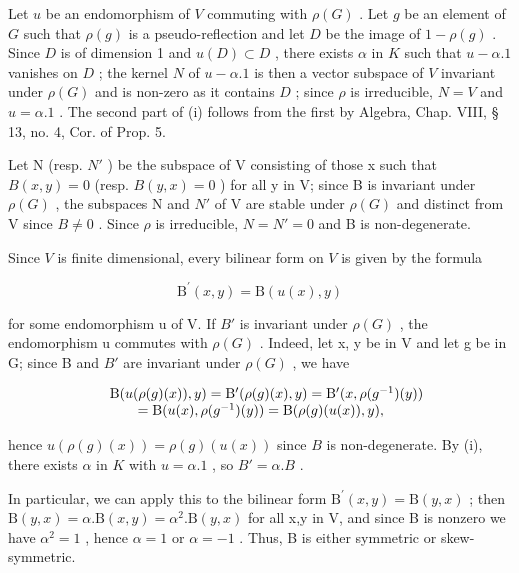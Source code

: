Let \(u\) be an endomorphism of \(V\) commuting with \(\rho(G)\) . Let \(g\) be an element of \(G\) such that \(\rho(g)\) is a pseudo-reflection and let \(D\) be the image of \(1 - \rho(g)\) . Since \(D\) is of dimension 1 and \(u(D) \subset D\) , there exists \(\alpha\) in \(K\) such that \(u - \alpha.1\) vanishes on \(D\) ; the kernel \(N\) of \(u - \alpha.1\) is then a vector subspace of \(V\) invariant under \(\rho(G)\) and is non-zero as it contains \(D\) ; since \(\rho\) is irreducible, \(N = V\) and \(u = \alpha.1\) . The second part of (i) follows from the first by Algebra, Chap. VIII, § 13, no. 4, Cor. of Prop. 5.

Let N (resp. \(N'\) ) be the subspace of V consisting of those x such that \(B(x,y)=0\) (resp. \(B(y,x)=0\) ) for all y in V; since B is invariant under \(\rho(G)\) , the subspaces N and \(N'\) of V are stable under \(\rho(G)\) and distinct from V since \(B\neq0\) . Since \(\rho\) is irreducible, \(N=N'=0\) and B is non-degenerate.

Since \(V\) is finite dimensional, every bilinear form on \(V\) is given by the formula

\[
\mathrm{B} ^ {\prime} (x, y) = \mathrm{B} (u (x), y)\tag{3}
\]

for some endomorphism u of V. If \(B'\) is invariant under \(\rho(G)\) , the endomorphism u commutes with \(\rho(G)\) . Indeed, let x, y be in V and let g be in G; since B and \(B'\) are invariant under \(\rho(G)\) , we have

\[
\begin{array}{r l} & {\mathrm{B} (u (\rho (g) (x)), y) = \mathrm{B} ^ {\prime} (\rho (g) (x), y) = \mathrm{B} ^ {\prime} (x, \rho (g ^ {- 1}) (y))} \\ & {\qquad = \mathrm{B} (u (x), \rho (g ^ {- 1}) (y)) = \mathrm{B} (\rho (g) (u (x)), y),} \end{array}
\]

hence \(u(\rho(g)(x)) = \rho(g)(u(x))\) since \(B\) is non-degenerate. By (i), there exists \(\alpha\) in \(K\) with \(u = \alpha.1\) , so \(B' = \alpha.B\) .

In particular, we can apply this to the bilinear form \(\mathrm{B}^{\prime}(x,y)=\mathrm{B}(y,x)\) ; then \(\mathrm{B}(y,x)=\alpha.\mathrm{B}(x,y)=\alpha^{2}.\mathrm{B}(y,x)\) for all x,y in V, and since B is nonzero we have \(\alpha^{2}=1\) , hence \(\alpha=1\) or \(\alpha=-1\) . Thus, B is either symmetric or skew-symmetric.

